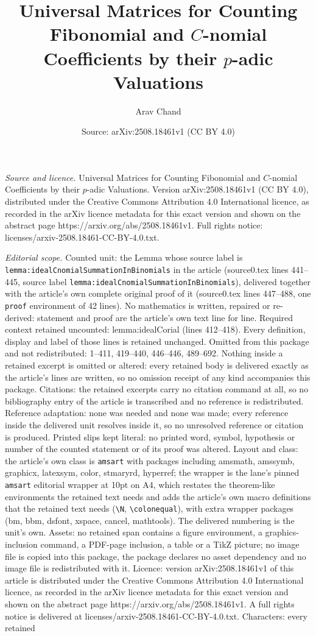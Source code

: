 \documentclass[10pt,a4paper]{amsart}
\title[Universal Matrices for Counting Fibonomial and $C$-nomial Co]{Universal Matrices for Counting Fibonomial and $C$-nomial Coefficients by their $p$-adic Valuations}
\author{Arav Chand}
\date{Source: arXiv:2508.18461v1 (CC BY 4.0)}
\begin{document}
\maketitle

\noindent\emph{Source and licence.} Universal Matrices for Counting Fibonomial and $C$-nomial Coefficients by their $p$-adic Valuations. Version arXiv:2508.18461v1 (CC BY 4.0), distributed under the Creative Commons Attribution 4.0 International licence, as recorded in the arXiv licence metadata for this exact version and shown on the abstract page https://arxiv.org/abs/2508.18461v1. Full rights notice: licenses/arxiv-2508.18461-CC-BY-4.0.txt.\par\smallskip

\noindent\textit{Editorial scope.} Counted unit: the Lemma whose source label is \texttt{lemma:idealCnomialSummationInBinomials} in the article (source0.tex lines 441--445, source label \texttt{lemma:idealCnomialSummationInBinomials}), delivered together with the article's own complete original proof of it (source0.tex lines 447--488, one \texttt{proof} environment of 42 lines). No mathematics is written, repaired or re-derived: statement and proof are the article's own text line for line. Required context retained uncounted: lemma:idealCorial (lines 412--418). Every definition, display and label of those lines is retained unchanged. Omitted from this package and not redistributed: 1--411, 419--440, 446--446, 489--692. Nothing inside a retained excerpt is omitted or altered: every retained body is delivered exactly as the article's lines are written, so no omission receipt of any kind accompanies this package. Citations: the retained excerpts carry no citation command at all, so no bibliography entry of the article is transcribed and no reference is redistributed. Reference adaptation: none was needed and none was made; every reference inside the delivered unit resolves inside it, so no unresolved reference or citation is produced. Printed slips kept literal: no printed word, symbol, hypothesis or number of the counted statement or of its proof was altered. Layout and class: the article's own class is \texttt{amsart} with packages including amsmath, amssymb, graphicx, latexsym, color, stmaryrd, hyperref; the wrapper is the lane's pinned \texttt{amsart} editorial wrapper at 10pt on A4, which restates the theorem-like environments the retained text needs and adds the article's own macro definitions that the retained text needs (\texttt{\textbackslash N}, \texttt{\textbackslash colonequal}), with extra wrapper packages (bm, bbm, dsfont, xspace, cancel, mathtools). The delivered numbering is the unit's own. Assets: no retained span contains a figure environment, a graphics-inclusion command, a PDF-page inclusion, a table or a TikZ picture; no image file is copied into this package, the package declares no asset dependency and no image file is redistributed with it. Licence: version arXiv:2508.18461v1 of this article is distributed under the Creative Commons Attribution 4.0 International licence, as recorded in the arXiv licence metadata for this exact version and shown on the abstract page https://arxiv.org/abs/2508.18461v1. A full rights notice is delivered at licenses/arxiv-2508.18461-CC-BY-4.0.txt. Characters: every retained 
\end{document}
